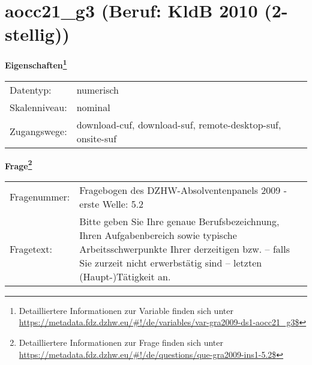 
    \setcounter{footnote}{0}

    \vspace*{-1.8cm}
	\section{aocc21\_g3 (Beruf: KldB 2010 (2-stellig))}
	\label{section:aocc21_g3}



    \vspace*{0.5cm}
    \noindent\textbf{Eigenschaften\footnote{Detailliertere Informationen zur Variable finden sich unter
		\url{https://metadata.fdz.dzhw.eu/\#!/de/variables/var-gra2009-ds1-aocc21_g3$}}}\\
	\begin{tabularx}{\hsize}{@{}lX}
	Datentyp: & numerisch \\
	Skalenniveau: & nominal \\
	Zugangswege: &
	  download-cuf, 
	  download-suf, 
	  remote-desktop-suf, 
	  onsite-suf
 \\
    \end{tabularx}



				\vspace*{0.5cm}
                \noindent\textbf{Frage\footnote{Detailliertere Informationen zur Frage finden sich unter
		              \url{https://metadata.fdz.dzhw.eu/\#!/de/questions/que-gra2009-ins1-5.2$}}}\\
				\begin{tabularx}{\hsize}{@{}lX}
					Fragenummer: &
					  Fragebogen des DZHW-Absolventenpanels 2009 - erste Welle:
					  5.2
 \\
					Fragetext: & Bitte geben Sie Ihre genaue Berufsbezeichnung, Ihren Aufgabenbereich sowie typische Arbeitsschwerpunkte Ihrer derzeitigen bzw. – falls Sie zurzeit nicht erwerbstätig sind – letzten (Haupt-)Tätigkeit an. \\
				\end{tabularx}





